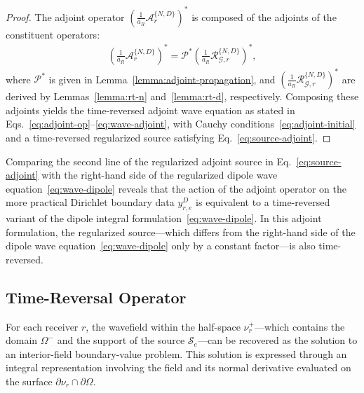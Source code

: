 \documentclass[11pt,reqno]{amsart}
\theoremstyle{remark}
\theoremstyle{italic_lemma}
\begin{document}
\begin{proof}
The adjoint operator \(  \left( \frac{1}{a_R} \mathcal{A}_r^{\{ N,D\}} \right)^* \) is composed of the adjoints of the constituent operators:
\begin{align}
    \left( \frac{1}{a_R}\mathcal{A}_r^{\{ N,D\}} \right)^* = \mathcal{P}^* \left( \frac{1}{a_R}\mathcal{R}_{\mathcal{G}, r}^{\{N,D\}} \right)^* ,
\end{align}
where \( \mathcal{P}^* \) is given in Lemma~\ref{lemma:adjoint-propagation}, and \( \left(\frac{1}{a_R} \mathcal{R}_{\mathcal{G}, r}^{\{N,D\}} \right)^* \) are derived by Lemmas~\ref{lemma:rt-n} and~\ref{lemma:rt-d}, respectively. Composing these adjoints yields the time-reversed adjoint wave equation as stated in Eqs.~\eqref{eq:adjoint-op}--\eqref{eq:wave-adjoint}, with Cauchy conditions~\eqref{eq:adjoint-initial} and a time-reversed regularized source satisfying Eq.~\eqref{eq:source-adjoint}.
\end{proof}


\noindent
Comparing the second line of the regularized adjoint source in Eq.~\eqref{eq:source-adjoint} with the right-hand side of the regularized dipole wave equation~\eqref{eq:wave-dipole} reveals that the action of the adjoint operator on the more practical Dirichlet boundary data \( y_{r,e}^D \) is equivalent to a time-reversed variant of the dipole integral formulation~\eqref{eq:wave-dipole}. In this adjoint formulation, the regularized source---which differs from the right-hand side of the dipole wave equation~\eqref{eq:wave-dipole} only by a constant factor---is also time-reversed.


\subsection{Time-Reversal Operator}
\label{sec:tr-op}

For each receiver \( r \), the wavefield within the half-space \( \nu_r^+ \)—which contains the domain \( \Omega^- \) and the support of the source \( \mathcal{S}_e \)—can be recovered as the solution to an interior-field boundary-value problem. This solution is expressed through an integral representation involving the field and its normal derivative evaluated on the surface \( \partial \nu_r \cap \partial \Omega \).
\end{document}
